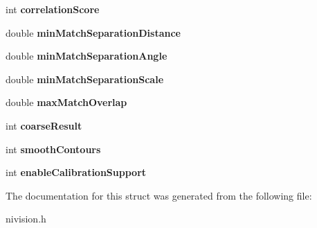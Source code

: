 \begin{DoxyCompactItemize}
\item 
\hypertarget{structMatchGeometricPatternAdvancedOptions2__struct_a51748096927414c29798d397e9c24a99}{
int {\bfseries correlationScore}}
\label{structMatchGeometricPatternAdvancedOptions2__struct_a51748096927414c29798d397e9c24a99}

\item 
\hypertarget{structMatchGeometricPatternAdvancedOptions2__struct_a1eaa3263d20dd4cda48306df32b6e9be}{
double {\bfseries minMatchSeparationDistance}}
\label{structMatchGeometricPatternAdvancedOptions2__struct_a1eaa3263d20dd4cda48306df32b6e9be}

\item 
\hypertarget{structMatchGeometricPatternAdvancedOptions2__struct_afe3a01a4a8f20ae7c3750cfb024eb90b}{
double {\bfseries minMatchSeparationAngle}}
\label{structMatchGeometricPatternAdvancedOptions2__struct_afe3a01a4a8f20ae7c3750cfb024eb90b}

\item 
\hypertarget{structMatchGeometricPatternAdvancedOptions2__struct_a77bd105824df12607689301be5c1c6d2}{
double {\bfseries minMatchSeparationScale}}
\label{structMatchGeometricPatternAdvancedOptions2__struct_a77bd105824df12607689301be5c1c6d2}

\item 
\hypertarget{structMatchGeometricPatternAdvancedOptions2__struct_a34e7a44974493ab06047277d6ac0eae5}{
double {\bfseries maxMatchOverlap}}
\label{structMatchGeometricPatternAdvancedOptions2__struct_a34e7a44974493ab06047277d6ac0eae5}

\item 
\hypertarget{structMatchGeometricPatternAdvancedOptions2__struct_a1df63831000577cd87d7fbefde0f93af}{
int {\bfseries coarseResult}}
\label{structMatchGeometricPatternAdvancedOptions2__struct_a1df63831000577cd87d7fbefde0f93af}

\item 
\hypertarget{structMatchGeometricPatternAdvancedOptions2__struct_a48224da1283c950d82eb9bb75c3fcc86}{
int {\bfseries smoothContours}}
\label{structMatchGeometricPatternAdvancedOptions2__struct_a48224da1283c950d82eb9bb75c3fcc86}

\item 
\hypertarget{structMatchGeometricPatternAdvancedOptions2__struct_a64b2739789b0363a1e84353353098763}{
int {\bfseries enableCalibrationSupport}}
\label{structMatchGeometricPatternAdvancedOptions2__struct_a64b2739789b0363a1e84353353098763}

\end{DoxyCompactItemize}


The documentation for this struct was generated from the following file:\begin{DoxyCompactItemize}
\item 
nivision.h\end{DoxyCompactItemize}
